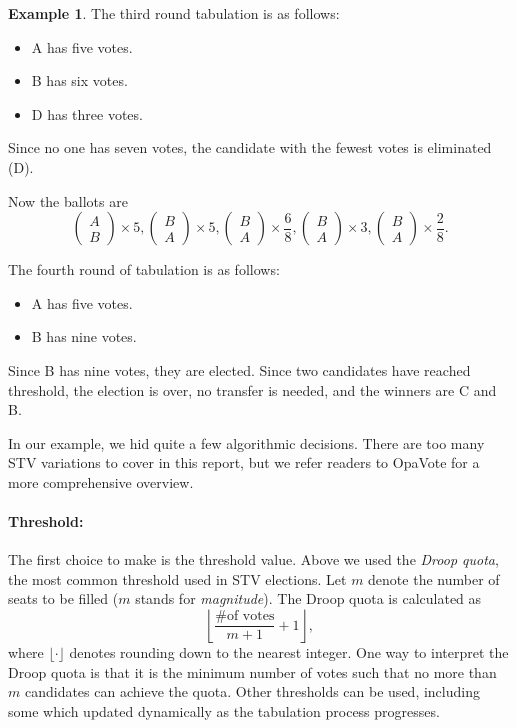 \documentclass{amsart}
\theoremstyle{definition}
\newtheorem{example}{Example}
\begin{document}
\begin{example}
    The third round tabulation is as follows:
    \begin{itemize}
        \item A has five votes.
        \item B has six votes.
        \item D has three votes.
    \end{itemize}
    Since no one has seven votes, the candidate with the fewest votes is eliminated (D).

    Now the ballots are 
    \[\begin{pmatrix}
        A\\B
    \end{pmatrix} \times 5, \begin{pmatrix}
        B\\A
    \end{pmatrix} \times 5,
    \begin{pmatrix}
        B\\A
    \end{pmatrix} \times \frac{6}{8},
    \begin{pmatrix}
        B\\A
    \end{pmatrix} \times 3,
    \begin{pmatrix}
        B\\A
    \end{pmatrix} \times \frac{2}{8}.\]

    The fourth round of tabulation is as follows:
    \begin{itemize}
        \item A has five votes.
        \item B has nine votes.
    \end{itemize}
    Since B has nine votes, they are elected.
    Since two candidates have reached threshold, the election is over, no transfer is needed, and the winners are
    C and B.

\end{example}

In our example, we hid quite a few algorithmic decisions. 
There are too many STV variations to cover in this report, 
but we refer readers to OpaVote for a more comprehensive overview.

\paragraph{\bf{Threshold:}}
The first choice to make is the threshold value. 
Above we used the \emph{Droop quota}, the most common threshold used in STV elections.
Let $m$ denote the number of seats to be filled ($m$ stands for \emph{magnitude}).
The Droop quota is calculated as
\[\left\lfloor\frac{\text{\# of votes}}{m+1} + 1\right\rfloor,\]
where $\lfloor \cdot \rfloor$ denotes rounding down to the nearest integer.
One way to interpret the Droop quota is that it is the minimum number of votes such 
that no more than $m$ candidates can achieve the quota.
Other thresholds can be used, including some which updated dynamically
as the tabulation process progresses.
\end{document}
